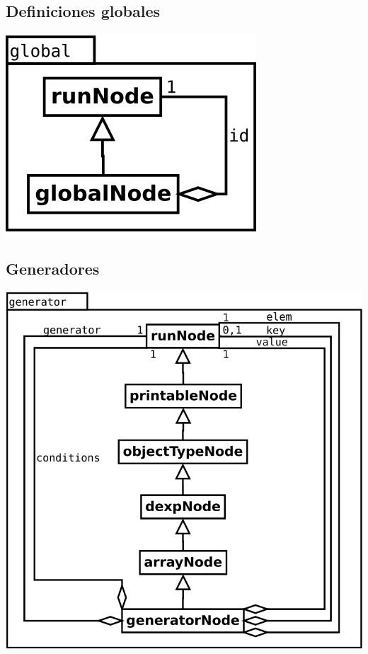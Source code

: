 \subsection {Definiciones globales}
\begin{center}
\includegraphics[scale=0.4]{global.png} \\
\end{center}

\subsection {Generadores}
\begin{center}
\includegraphics[scale=0.4]{generator.png} \\
\end{center}
\pagebreak
